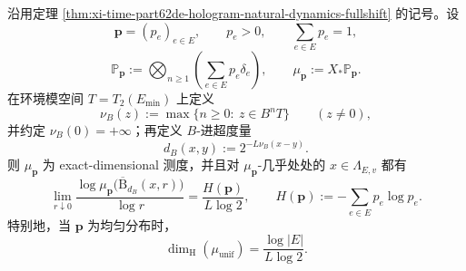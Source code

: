 \begin{theorem}\label{thm:xi-time-part62de-hologram-ambient-bernoulli-exact-dimensional}
沿用定理 \ref{thm:xi-time-part62de-hologram-natural-dynamics-fullshift} 的记号。设
\[
\mathbf p=(p_e)_{e\in E},
\qquad
p_e>0,
\qquad
\sum_{e\in E}p_e=1,
\]
\[
\mathbb P_{\mathbf p}
:=
\bigotimes_{n\ge 1}\left(\sum_{e\in E}p_e\delta_e\right),
\qquad
\mu_{\mathbf p}:=X_*\mathbb P_{\mathbf p}.
\]
在环境模空间 \(T=T_2(E_{\min})\) 上定义
\[
\nu_B(z):=\max\{n\ge 0:\ z\in B^nT\}
\qquad (z\neq 0),
\]
并约定 \(\nu_B(0)=+\infty\)；再定义 \(B\)-进超度量
\[
d_B(x,y):=2^{-L\nu_B(x-y)}.
\]
则 \(\mu_{\mathbf p}\) 为 exact-dimensional 测度，并且对 \(\mu_{\mathbf p}\)-几乎处处的 \(x\in \Lambda_{E,v}\) 都有
\[
\lim_{r\downarrow 0}
\frac{\log \mu_{\mathbf p}\!\bigl(\overline{\mathrm B}_{d_B}(x,r)\bigr)}{\log r}
=
\frac{H(\mathbf p)}{L\log 2},
\qquad
H(\mathbf p):=-\sum_{e\in E}p_e\log p_e.
\]
特别地，当 \(\mathbf p\) 为均匀分布时，
\[
\dim_{\mathrm H}(\mu_{\mathrm{unif}})
=
\frac{\log |E|}{L\log 2}.
\]
\end{theorem}
